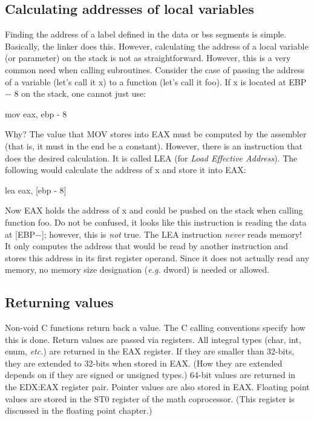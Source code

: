\subsection{Calculating addresses of local variables}

Finding the address of a label defined in the {\code data} or {\code
bss} segments is simple. Basically, the linker does this. However,
calculating the address of a local variable (or parameter) on the
stack is not as straightforward. However, this is a very common need
when calling subroutines. Consider the case of passing the address of
a variable (let's call it {\code x}) to a function (let's call it
{\code foo}).  If {\code x} is located at EBP $-$ 8 on the stack, one
cannot just use:
\begin{AsmCodeListing}[numbers=none,frame=none]
      mov    eax, ebp - 8
\end{AsmCodeListing}
Why? The value that {\code MOV} stores into EAX must be computed by
the assembler (that is, it must in the end be a constant). However,
there is an instruction that does the desired calculation. It is
called  {\code LEA}  (for \emph{Load Effective Address}). The following
would calculate the address of {\code x} and store it into EAX:
\begin{AsmCodeListing}[numbers=none,frame=none]
      lea    eax, [ebp - 8]
\end{AsmCodeListing}
Now EAX holds the address of {\code x} and could be pushed on the
stack when calling function {\code foo}. Do not be confused, it looks
like this instruction is reading the data at
[EBP\nolinebreak$-$]; however, this is \emph{not}
true. The {\code LEA} instruction \emph{never} reads memory! It only
computes the address that would be read by another instruction and
stores this address in its first register operand. Since it does not
actually read any memory, no memory size designation (\emph{e.g.}
{\code dword}) is needed or allowed.


\subsection{Returning values}

Non-void C functions return back a value. The C calling conventions
specify how this is done. Return values are passed via registers. All
integral types ({\code char}, {\code int}, {\code enum}, \emph{etc.})
are returned in the EAX register. If they are smaller than 32-bits,
they are extended to 32-bits when stored in EAX. (How they are
extended depends on if they are signed or unsigned types.) 64-bit values
are returned in the EDX:EAX register pair. Pointer
values are also stored in EAX. Floating point values are stored in the
ST0 register of the math coprocessor. (This register is discussed in
the floating point chapter.)

